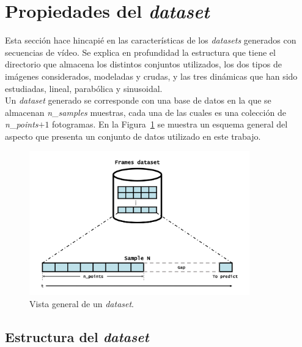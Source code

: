 \section{Propiedades del \textit{dataset}}

Esta sección hace hincapié en las características de los \textit{datasets} generados con secuencias de vídeo. Se explica en profundidad la estructura que tiene el directorio que almacena los distintos conjuntos utilizados, los dos tipos de imágenes considerados, modeladas y crudas, y las tres dinámicas que han sido estudiadas, lineal, parabólica y sinusoidal.\\

Un \textit{dataset} generado se corresponde con una base de datos en la que se almacenan \textit{n}\_\textit{samples} muestras, cada una de las cuales es una colección de \textit{n}\_\textit{points}$+1$ fotogramas. En la Figura~\ref{fig.dataset} se muestra un esquema general del aspecto que presenta un conjunto de datos utilizado en este trabajo.

\begin{figure}[H]
		\begin{center}
			\includegraphics[width=0.85\textwidth]{ figures/dataset.png}
			\caption{Vista general de un \textit{dataset}.}
			\label{fig.dataset}
		\end{center}
\end{figure}

\subsection{Estructura del \textit{dataset}} \label{ap.estructura}

